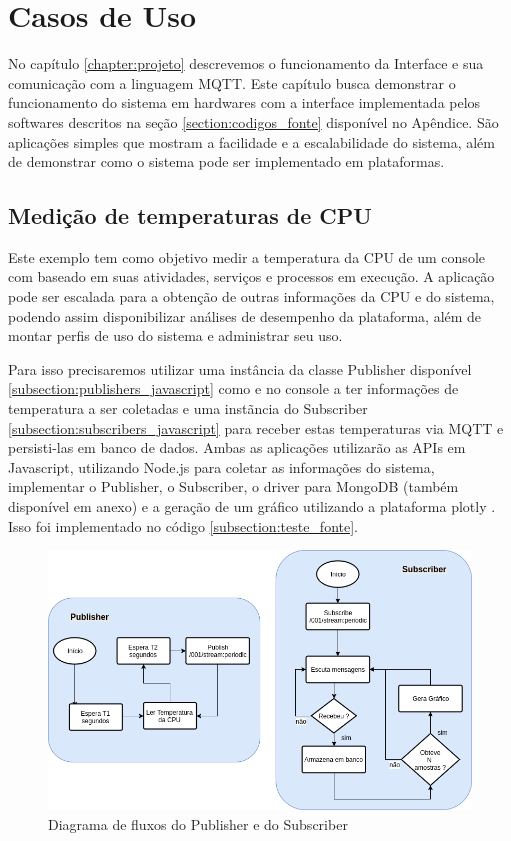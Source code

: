 \chapter{Casos de Uso}
\label{chapter:casos_de_uso}

No capítulo \ref{chapter:projeto} descrevemos o funcionamento da Interface e sua comunicação com a linguagem MQTT. Este capítulo busca demonstrar o funcionamento do sistema em hardwares com a interface implementada pelos softwares descritos na seção \ref{section:codigos_fonte} disponível no Apêndice. São aplicações simples que mostram a facilidade e a escalabilidade do sistema, além de demonstrar como o sistema pode ser implementado em plataformas.

\section{Medição de temperaturas de CPU}
\label{section:temp_cpu}

Este exemplo tem como objetivo medir a temperatura da CPU de um console com baseado em suas atividades, serviços e processos em execução. A aplicação pode ser escalada para a obtenção de outras informações da CPU e do sistema, podendo assim disponibilizar análises de desempenho da plataforma, além de montar perfis de uso do sistema e administrar seu uso.

Para isso precisaremos utilizar uma instância da classe Publisher disponível  \ref{subsection:publishers_javascript} como e no console a ter informações de temperatura a ser coletadas e uma instãncia do Subscriber \ref{subsection:subscribers_javascript} para receber estas temperaturas via MQTT e persisti-las em banco de dados. Ambas as aplicações utilizarão as APIs em Javascript, utilizando Node.js para coletar as informações do sistema, implementar o Publisher, o Subscriber, o driver para MongoDB (também disponível em anexo) e a geração de um gráfico utilizando a plataforma plotly \cite{plotly}. Isso foi implementado no código \ref{subsection:teste_fonte}.


\begin{figure}[h!]
\centering
\includegraphics[width=11.5cm]{./02_Capitulos/02_Cap4/figures/fluxo_controle_temp}
\caption{Diagrama de fluxos do Publisher e do Subscriber}
\label{fig:4.1.0/fluxo_controle_temp}
\end{figure}

